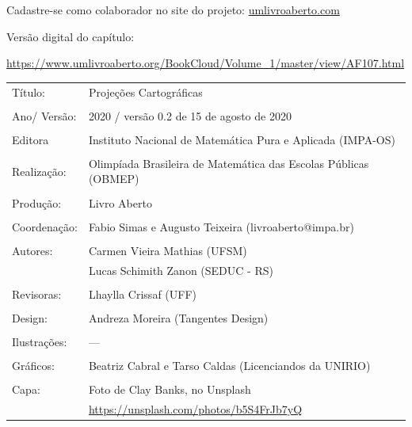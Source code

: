 \vspace*{.3cm}

Cadastre-se como colaborador no site do projeto: \url{umlivroaberto.com}

Versão digital do capítulo:

\url{https://www.umlivroaberto.org/BookCloud/Volume_1/master/view/AF107.html}


\begin{tabular}{p{}p{}}
Título: & Projeções Cartográficas\\
\\
Ano/ Versão: & 2020 / versão 0.2 de 15 de agosto de 2020\\
\\
Editora & Instituto Nacional de Matem\'atica Pura e Aplicada (IMPA-OS)\\
\\
Realização:& Olimp\'iada Brasileira de Matem\'atica das Escolas P\'ublicas (OBMEP)\\
\\
Produção:& Livro Aberto\\
\\
Coordenação:& Fabio Simas e Augusto Teixeira (livroaberto@impa.br)\\
\\
  Autores: & Carmen Vieira Mathias (UFSM)\\
             & Lucas Schimith Zanon (SEDUC - RS)\\
\\
Revisoras: &  Lhaylla Crissaf (UFF) \\
\\
Design: & Andreza Moreira (Tangentes Design) \\
\\
  Ilustrações: & --- \\ 
\\
Gráficos: & Beatriz Cabral e Tarso Caldas (Licenciandos da UNIRIO)\\
\\
  Capa: & Foto de Clay Banks, no Unsplash \\
  & \url{https://unsplash.com/photos/b5S4FrJb7yQ} \\
\end{tabular}
\vspace{.5cm}



